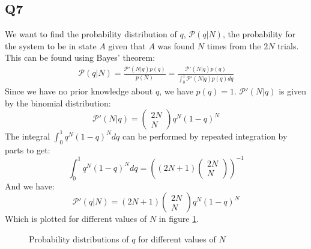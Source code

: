 \documentclass[../main.tex]{subfiles}
\begin{document}
\subsection{Q7}
We want to find the probability distribution of $q$, $\mathcal{P}(q|N)$, the probability for the system to be in state $A$ given that $A$ was found $N$ times from the $2N$ trials.
This can be found using Bayes' theorem:
\begin{align}
	\mathcal{P}(q|N) = \frac{\mathcal{P}'(N|q)p(q)}{p(N)} = \frac{\mathcal{P}'(N|q)p(q)}{\int_0^1\mathcal{P}'(N|q)p(q)dq}
\end{align}
Since we have no prior knowledge about $q$, we have $p(q)=1$. $\mathcal{P}'(N|q)$ is given by the binomial distribution: 
\begin{equation}
	\mathcal{P}'(N|q)=\left(\begin{matrix}2N\\N\end{matrix}\right)q^N(1-q)^N
\end{equation}
The integral $\int_0^1q^N(1-q)^Ndq$ can be performed by repeated integration by parts to get:
\begin{equation}
	\int_0^1q^N(1-q)^Ndq = \left((2N+1)\left(\begin{matrix}2N\\N\end{matrix}\right)\right)^{-1}
\end{equation}
And we have:
\begin{equation}
	\mathcal{P}'(q|N) = (2N+1)\left(\begin{matrix}2N\\N\end{matrix}\right)q^N(1-q)^N
\end{equation}
Which is plotted for different values of $N$ in figure \ref{fig:bayes_prob_dists}.
\begin{figure}
\centering
\subfloat{
}\qquad
\caption{Probability distributions of $q$ for different values of $N$}
\label{fig:bayes_prob_dists}
\end{figure}
\end{document}
